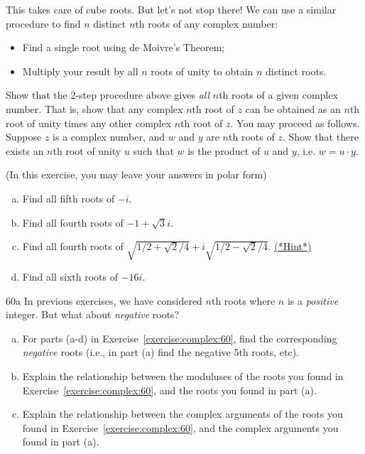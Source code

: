 This takes care of cube roots. But let's not stop there! We can use a similar procedure to find  $n$ distinct $n$th roots of any complex number:
\begin{itemize}
\item Find a single root using de Moivre's Theorem;
\item Multiply your result by all $n$ roots of unity to obtain $n$ distinct roots.
\end{itemize}

\begin{exercise}{}
Show that the 2-step procedure above gives \emph{all} $n$th roots of a given complex number. That is, show that any complex $n$th root of $z$ can be obtained as an $n$th root of unity times any other complex $n$th root of $z$. You may proceed as follows. Suppose $z$ is a complex number, and $w$ and $y$ are $n$th roots of $z$. Show that there exists an $n$th root of unity $u$ such that $w$ is the product of $u$ and $y$, i.e. $w=u \cdot y$. 
\end{exercise}

\begin{exercise}{60}
(In this exercise, you may leave your answers in polar form)
\begin{enumerate}[(a)]
\item
Find all fifth roots of $-i$.
\item
Find all fourth roots of $-1 + \sqrt{3}i$.
\item
Find all fourth roots of $ \sqrt{1/2 + \sqrt{2}/4} + i\sqrt{1/2 - \sqrt{2}/4}$. 
\hyperref[sec:complex:hints]{(*Hint*)}
\item
Find all sixth roots of $-16i$.
\end{enumerate}
\end{exercise}

\begin{exercise}{60a}
In previous exercises, we have considered $n$th roots where $n$ is a \emph{positive} integer. But what about \emph{negative} roots?
\begin{enumerate}[(a)]
\item
For parts (a-d) in Exercise~\ref{exercise:complex:60}, find the corresponding \emph{negative} roots (i.e., in part (a) find the negative 5th roots, etc).
\item
Explain the relationship between the moduluses of the roots you found in Exercise~\ref{exercise:complex:60}, and the roots you found in part (a).
\item
Explain the relationship between the complex arguments of the roots you found in Exercise~\ref{exercise:complex:60}, and the complex arguments you found in part (a).
\end{enumerate}
\end{exercise}

